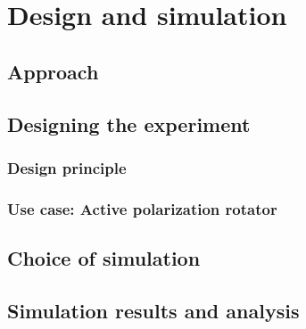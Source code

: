 \documentclass[../report.tex]{subfiles}
\begin{document}
	

\chapter{Design and simulation}

	\section{Approach}
	
	\section{Designing the experiment}

		\subsection{Design principle}
	
		\subsection{Use case: Active polarization rotator}
	
	\section{Choice of simulation}
	
	\section{Simulation results and analysis}
	
\end{document}
